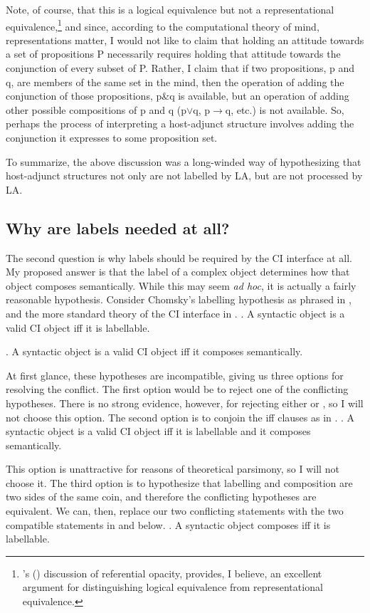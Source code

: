 \documentclass[MilwayThesis]{subfiles}
\begin{document}
Note, of course, that this is a logical equivalence but not a representational equivalence,\footnote{
	\citeauthor{fodor1975language}'s (\citeyear[50--100]{fodor2010lot}) discussion of referential opacity, provides, I believe, an excellent argument for distinguishing logical equivalence from representational equivalence.
} and since, according to the computational theory of mind, representations matter, I would not like to claim that holding an attitude towards a set of propositions P necessarily requires holding that attitude towards the conjunction of every subset of P.
Rather, I claim that if two propositions, p and q, are members of the same set in the mind, then the operation of adding the conjunction of those propositions, p\&q is available, but an operation of adding other possible compositions of p and q (p$\vee$q, p$\rightarrow$q, etc.) is not available.
So, perhaps the process of interpreting a host-adjunct structure involves adding the conjunction it expresses to some proposition set.

To summarize, the above discussion was a long-winded way of hypothesizing that host-adjunct structures not only are not labelled by LA, but are not processed by LA.

\subsection{Why are labels needed at all?}\label{sec:label-sem}
The second question is why labels should be required by the CI interface at all.
My proposed answer is that the label of a complex object determines how that object composes semantically.
While this may seem \textit{ad hoc}, it is actually a fairly reasonable hypothesis.
Consider Chomsky's labelling hypothesis as phrased in \Next, and the more standard theory of the CI interface in \NNext.
\ex. A syntactic object is a valid CI object iff it is labellable.

\ex. A syntactic object is a valid CI object iff it composes semantically.

At first glance, these hypotheses are incompatible, giving us three options for resolving the conflict.
The first option would be to reject one of the conflicting hypotheses.
There is no strong evidence, however, for rejecting either \LLast or \Last, so I will not choose this option.
The second option is to conjoin the iff clauses as in \Next.
\ex. A syntactic object is a valid CI object iff it is labellable and it composes semantically.

This option is unattractive for reasons of theoretical parsimony, so I will not choose it.
The third option is to hypothesize that labelling and composition are two sides of the same coin, and therefore the conflicting hypotheses are equivalent.
We can, then, replace our two conflicting statements with the two compatible statements in \Next and \NNext below.
\ex. A syntactic object composes iff it is labellable.
\end{document}

